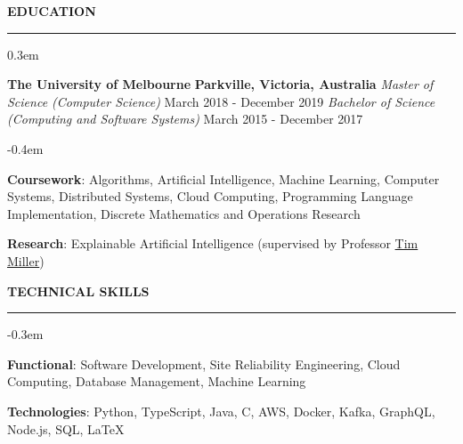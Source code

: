 \documentclass{cv}
\begin{document}
\smallskip


\textbf{\uppercase{Education}}
\sectionlineskip
\hrule height 0.1em
\begin{list}{}{\setlength{\leftmargin}{0em}}
\itemsep 0.3em
\item
    \textbf{The University of Melbourne} \hfill \textbf{Parkville, Victoria, Australia}%
    \vspace{0.1em} \newline
    {\textit{Master of Science (Computer Science)}} \hfill {March 2018 - December 2019}%
    \newline
    {\textit{Bachelor of Science (Computing and Software Systems)}} \hfill {March 2015 - December 2017}%
    \begin{list}{\raisebox{0.2em}{\tiny$\bullet$} \hspace{0em}}{\setlength{\leftmargin}{2.0em}}
        \itemsep -0.4em \vspace{-0.4em}
        \item \textbf{Coursework}: Algorithms, Artificial Intelligence, Machine Learning, Computer Systems, Distributed Systems, Cloud Computing, Programming Language Implementation, Discrete Mathematics and Operations Research
        \item \textbf{Research}: Explainable Artificial Intelligence (supervised by Professor \href{https://eecs.uq.edu.au/profile/9477/tim-miller}{Tim Miller})
    \end{list}
\end{list}


\sectionskip


\textbf{\uppercase{Technical Skills}}
\sectionlineskip
\hrule height 0.1em
\begin{list}{}{\setlength{\leftmargin}{0em}}
\itemsep -0.3em
\item
    \textbf{Functional}: Software Development, Site Reliability Engineering, Cloud Computing, Database Management, Machine Learning
\item
    \textbf{Technologies}: Python, TypeScript, Java, C, AWS, Docker, Kafka, GraphQL, Node.js, SQL, \LaTeX
\end{list}
\end{document}
